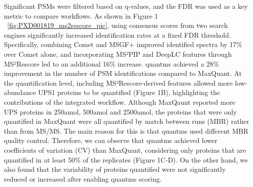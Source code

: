 \documentclass[12pt]{article}
\begin{document}

Significant PSMs were filtered based on q-values, and the FDR was used as a key metric to compare workflows. As shown in Figure 1 ~\ref{fig:PXD001819_ms2rescore_pic}, using consensus scores from two search engines significantly increased identification rates at a fixed FDR threshold. Specifically, combining Comet and MSGF+ improved identified spectra by 17\% over Comet alone, and incorporating MS²PIP and DeepLC features through MS²Rescore led to an additional 16\% increase. quantms achieved a 28\% improvement in the number of PSM identifications compared to MaxQuant. At the quantification level, including MS²Rescore-derived features allowed more low-abundance UPS1 proteins to be quantified (Figure 1B), highlighting the contributions of the integrated workflow. Although MaxQaunt reported more UPS proteins in 250amol, 500amol and 2500amol, the proteins that were only quantified in MaxQuant were all quantified by match between runs (MBR) rather than from MS/MS. The main reason for this is that quantms used different MBR quality control. Therefore, we can observe that quantms achieved lower coefficients of variation (CV) than MaxQuant, considering only proteins that are quantified in at least 50\% of the replicates (Figure 1C-D). On the other hand, we also found that the variability of proteins quantified were not significantly reduced or increased after enabling quantms  scoring.
\end{document}
